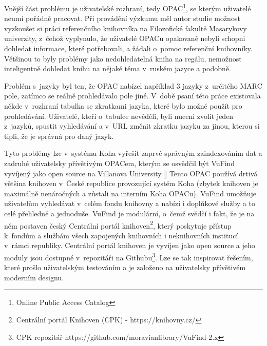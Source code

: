 \documentclass[
	11pt, oneside, printed, draft, 
	table,   %
	lof,     %
	lot     %
]{fithesis3}
\newcommand{\citepages}[2]{[\cite[#1]{#2}]}
\begin{document}
{Vnější část problému je uživatelské rozhraní, tedy OPAC\footnote{Online Public Access Catalog
}, se kterým uživatelé neumí pořádně pracovat. Při provádění výzkumu měl autor studie možnost vyzkoušet si práci referenčního knihovníka na Filozofické fakultě Masarykovy univerzity, z~čehož vyplynulo, že uživatelé OPACu opakovaně nebyli schopni dohledat informace, které potřebovali, a žádali o~pomoc referenční knihovníky. Většinou to byly problémy jako nedohledatelná kniha na regálu, nemožnost inteligentně dohledat knihu na nějaké téma v~ruském jazyce a podobně.

Problém s~jazyky byl ten, že OPAC nabízel například 3 jazyky z~určitého MARC pole, zatímco se reálně prohledávalo pole jiné. V~době psaní této práce existovala někde v~rozhraní tabulka se zkratkami jazyka, které bylo možné použít pro prohledávání. Uživatelé, kteří o~tabulce nevěděli, byli nuceni zvolit jeden z~jazyků, spustit vyhledávání a v~URL změnit zkratku jazyku za jinou, kterou si tipli, že je správná pro daný jazyk.

Tyto problémy lze v~systému Koha vyřešit zaprvé správným zaindexováním dat a zadruhé uživatelsky přívětivým OPACem, kterým se osvědčil být VuFind vyvíjený jako open source na Villanova University.\citepages{12}{Coufalova2009} Tento OPAC používá drtivá většina knihoven v~České republice provozující systém Koha (zbytek knihoven je maximálně nenáročných a zůstali na interním Koha OPACu). VuFind umožňuje uživatelům vyhledávat v~celém fondu knihovny a nabízí i doplňkové služby a to celé přehledně a jednoduše. VuFind je modulární, o~čemž svědčí i fakt, že je na něm postaven český Centrální portál knihoven\footnote{Centrální portál Knihoven (CPK) - https://knihovny.cz/}, který poskytuje přístup k~fondům a službám všech zapojených knihovních i neknihovních institucí v~rámci republiky. Centrální portál knihoven je vyvíjen jako open source a jeho moduly jsou dostupné v~repozitáři na Githubu\footnote{CPK repozitář https://github.com/moravianlibrary/VuFind-2.x
}. Lze se tak inspirovat řešením, které prošlo uživatelským testováním a je založeno na uživatelsky přívětivém moderním designu. %

}
\end{document}
